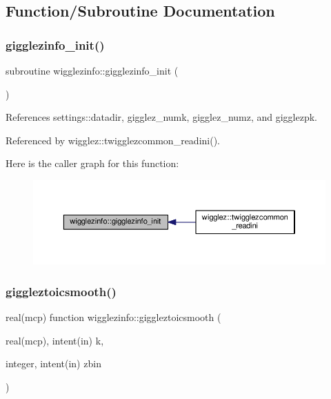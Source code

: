 \subsection{Function/\+Subroutine Documentation}
\mbox{\label{namespacewigglezinfo_a7c041022fefbb50e12a454d1cc60c14f}} 
\subsubsection{\texorpdfstring{gigglezinfo\+\_\+init()}{gigglezinfo\_init()}}
{\footnotesize\ttfamily subroutine wigglezinfo\+::gigglezinfo\+\_\+init (\begin{DoxyParamCaption}{ }\end{DoxyParamCaption})}



References settings\+::datadir, gigglez\+\_\+numk, gigglez\+\_\+numz, and gigglezpk.



Referenced by wigglez\+::twigglezcommon\+\_\+readini().

Here is the caller graph for this function\+:
\nopagebreak
\begin{figure}[H]
\begin{center}
\leavevmode
\includegraphics[width=350pt]{namespacewigglezinfo_a7c041022fefbb50e12a454d1cc60c14f_icgraph}
\end{center}
\end{figure}
\mbox{\label{namespacewigglezinfo_aa01d4906da1313fa5a21d8f3b5029f50}} 
\subsubsection{\texorpdfstring{giggleztoicsmooth()}{giggleztoicsmooth()}}
{\footnotesize\ttfamily real(mcp) function wigglezinfo\+::giggleztoicsmooth (\begin{DoxyParamCaption}\item[{real(mcp), intent(in)}]{k,  }\item[{integer, intent(in)}]{zbin }\end{DoxyParamCaption})}



